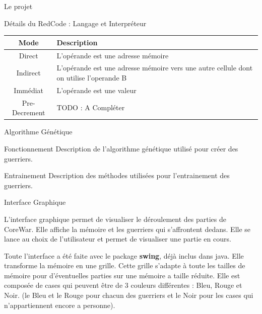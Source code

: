 \documentclass[a4paper, 10pt]{article}
\begin{document}
\begin{section}{Le projet}
\begin{subsection}{Détails du RedCode : Langage et Interpréteur}
            \begin{tabular}{|c|p{8cm}|}
                \hline
                    \textbf{Mode} & \textbf{Description} \\
                \hline
                    Direct & L'opérande est une adresse mémoire \\
                \hline
                    Indirect & L'opérande est une adresse mémoire vers une autre cellule dont on utilise l'operande B \\
                \hline
                    Immédiat & L'opérande est une valeur \\
                \hline
                    Pre-Decrement & TODO : A Compléter\\
                \hline
            \end{tabular}
        \end{subsection}




        \begin{subsection}{Algorithme Génétique}
            \begin{subsubsection}{Fonctionnement}
                Description de l'algorithme génétique utilisé pour créer des guerriers.
            \end{subsubsection}

            \begin{subsubsection}{Entrainement}
                Description des méthodes utilisées pour l'entrainement des guerriers.
            \end{subsubsection}
        \end{subsection}



        \begin{subsection}{Interface Graphique}
            \par
                L'interface graphique permet de visualiser le déroulement des parties de CoreWar. Elle affiche la mémoire et les guerriers qui s'affrontent dedans.
                Elle se lance au choix de l'utilisateur et permet de visualiser une partie en cours. 
                \smallskip
            \par
                Toute l'interface a été faite avec le package \textbf{swing}, déjà inclus dans java. Elle transforme la mémoire en une grille. Cette grille s'adapte à toute les tailles de mémoire pour d'éventuelles parties sur une mémoire a taille réduite. Elle est composée de cases qui peuvent être de 3 couleurs différentes : Bleu, Rouge et Noir. (le Bleu et le Rouge pour chacun des guerriers et le Noir pour les cases qui n'appartiennent encore a personne).
                \bigskip
            

\end{subsection}
\end{section}
\end{document}

